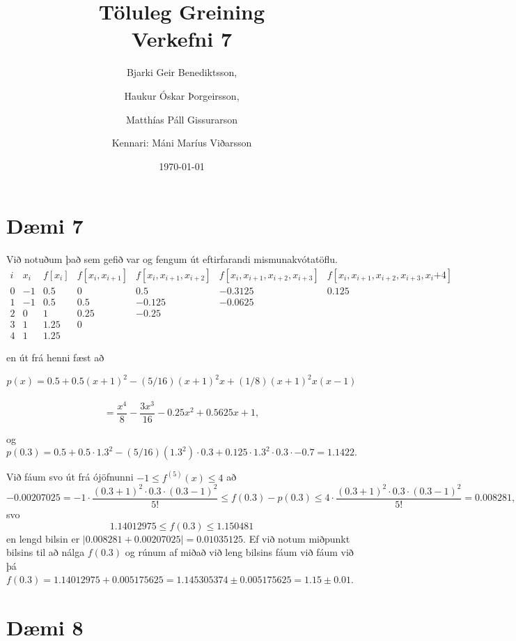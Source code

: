 \documentclass[a4]{article}
\title{Töluleg Greining\\ Verkefni 7}
\date{\today{}}
\author{ 
  Bjarki Geir Benediktsson,\and
  Haukur Óskar Þorgeirsson,\and
  Matthías Páll Gissurarson \and
  Kennari: Máni Maríus Viðarsson
  }
\begin{document}
\maketitle
\section{Dæmi 7}

Við notuðum það sem gefið var og fengum út eftirfarandi
mismunakvótatöflu.
$$
  \begin{array}{|l|l|l|l|l|l|l|}
    \hline
    i & x_i & f[x_i] & f[x_i,x_{i+1}] & f[x_i,x_{i+1},x_{i+2}] & f[x_i,x_{i+1},x_{i+2},x_{i+3}] & f[x_i,x_{i+1},x_{i+2},x_{i+3},x_i{+4}] \\
    \hline
    0 & -1 & 0.5 & 0 & 0.5 & -0.3125 & 0.125 \\
    1 & -1 & 0.5 & 0.5 & -0.125 & -0.0625 & \\
    2 & 0 & 1 & 0.25 & -0.25 & & \\
    3 & 1 & 1.25 & 0 & & & \\
    4 & 1 & 1.25 & & & &
  \end{array}
$$

en út frá henni fæst að

$$p(x) = 0.5 + 0.5(x+1)^2 - (5/16)(x+1)^2x + (1/8)(x+1)^2x(x-1)$$\\
$$= \frac{x^4}{8}-\frac{3x^3}{16}-0.25 x^2+ 0.5625 x+1,$$

og $$p(0.3) = 0.5 + 0.5\cdot 1.3^2 - (5/16)(1.3^2)\cdot 0.3 + 0.125
\cdot 1.3^2\cdot 0.3 \cdot -0.7 = 1.1422.$$

Við fáum svo út frá ójöfnunni $-1 \leq f^{(5)}(x) \leq 4$ að
$$-0.00207025 = -1 \cdot \frac{(0.3+1)^2\cdot 0.3 \cdot (0.3-1)^2}{5!}
\leq f(0.3) - p(0.3) \leq 4 \cdot \frac{(0.3+1)^2\cdot 0.3 \cdot
  (0.3-1)^2}{5!} = 0.008281,$$ svo
$$1.14012975 \leq f(0.3) \leq 1.150481$$ en lengd bilsin er $|0.008281 + 0.00207025| = 0.01035125$.  Ef við notum miðpunkt bilsins til að nálga
$f(0.3)$ og rúnum af miðað við leng bilsins fáum við fáum við þá
$f(0.3) = 1.14012975 + 0.005175625 = 1.145305374 \pm 0.005175625 = 1.15 \pm 0.01$.

\section{Dæmi 8}
\end{document}
